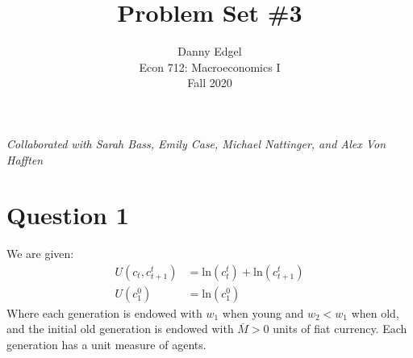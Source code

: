 \documentclass{article}
\newcommand{\loge}[1]{\text{ln}\left(#1\right)}
\begin{document}
\title{	Problem Set \#3 }
\author{ 	Danny Edgel 					\\ 
			Econ 712: Macroeconomics I		\\
			Fall 2020						\\
		}
\maketitle\thispagestyle{empty}


\noindent\textit{Collaborated with Sarah Bass, Emily Case, Michael Nattinger, and Alex Von Hafften}



\section*{Question 1}
We are given:
\begin{align*}
	U(c_t,c_{t+1}^t)&=\loge{c_t^t}+\loge{c_{t+1}^t}	\\
	U(c_1^0) &= \loge{c_1^0}
\end{align*}
Where each generation is endowed with $w_1$ when young and $w_2<w_1$ when old, and the initial old generation is endowed with $\overline{M}>0$ units of fiat currency. Each generation has a unit measure of agents.
\end{document}
